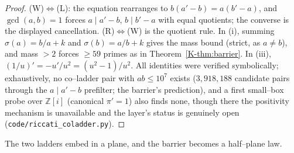 \documentclass[11pt]{article}
\theoremstyle{definition}
\begin{document}
\begin{proof}
\textup{(W)}$\Leftrightarrow$\textup{(L)}: the equation rearranges to $b(a'-b)=a(b'-a)$, and
$\gcd(a,b)=1$ forces $a\mid a'-b$, $b\mid b'-a$ with equal quotients; the converse is the displayed
cancellation. \textup{(R)}$\Leftrightarrow$\textup{(W)} is the quotient rule. In (i), summing
$\sigma(a)=b/a+k$ and $\sigma(b)=a/b+k$ gives the mass bound (strict, as $a\neq b$), and mass
$>2$ forces $\ge59$ primes as in Theorem~\ref{K-thm:barrier}. In (iii),
$(1/u)'=-u'/u^2=(u^2-1)/u^2$. All identities were verified symbolically; exhaustively, no
co--ladder pair with $ab\le10^7$ exists ($3{,}918{,}188$ candidate pairs through the $a\mid a'-b$
prefilter; the barrier's prediction), and a first small--box probe over $\mathbb{Z}[i]$
(canonical $\pi'=1$) also finds none, though there the positivity mechanism is unavailable and the
layer's status is genuinely open (\texttt{code/riccati\_coladder.py}).
\end{proof}

The two ladders embed in a plane, and the barrier becomes a half--plane law.
\end{document}
